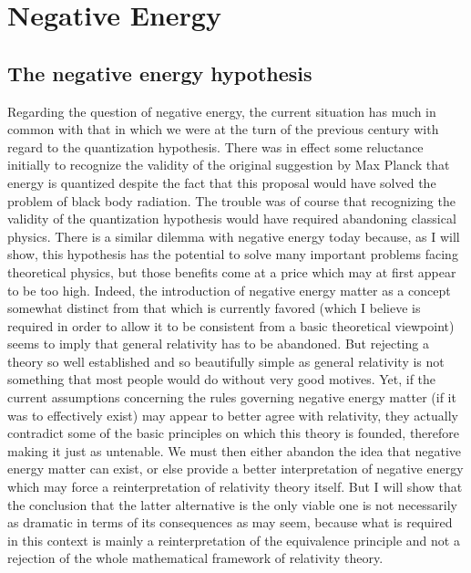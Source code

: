 \documentclass[notitlepage,12pt]{report}
\begin{document}
\chapter{Negative Energy\label{chap:02}}

\section{The negative energy hypothesis}

Regarding the question of negative energy, the current situation has much in common with that in which we were at the turn of the previous century with regard to the quantization hypothesis. There was in effect some reluctance initially to recognize the validity of the original suggestion by Max Planck that energy is quantized despite the fact that this proposal would have solved the problem of black body radiation. The trouble was of course that recognizing the validity of the quantization hypothesis would have required abandoning classical physics. There is a similar dilemma with negative energy today because, as I will show, this hypothesis has the potential to solve many important problems facing theoretical physics, but those benefits come at a price which may at first appear to be too high. Indeed, the introduction of negative energy matter as a concept somewhat distinct from that which is currently favored (which I believe is required in order to allow it to be consistent from a basic theoretical viewpoint) seems to imply that general relativity has to be abandoned. But rejecting a theory so well established and so beautifully simple as general relativity is not something that most people would do without very good motives. Yet, if the current assumptions concerning the rules governing negative energy matter (if it was to effectively exist) may appear to better agree with relativity, they actually contradict some of the basic principles on which this theory is founded, therefore making it just as untenable. We must then either abandon the idea that negative energy matter can exist, or else provide a better interpretation of negative energy which may force a reinterpretation of relativity theory itself. But I will show that the conclusion that the latter alternative is the only viable one is not necessarily as dramatic in terms of its consequences as may seem, because what is required in this context is mainly a reinterpretation of the equivalence principle and not a rejection of the whole mathematical framework of relativity theory.
\end{document}
